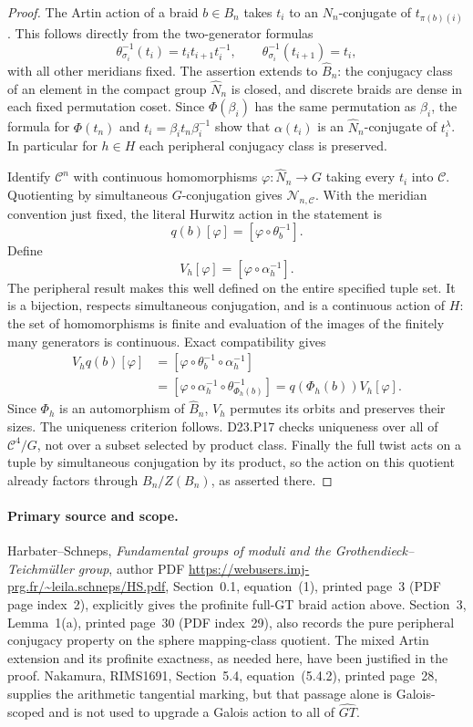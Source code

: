 \begin{proof}
The Artin action of a braid $b\in B_n$ takes $t_i$ to an
$N_n$-conjugate of $t_{\pi(b)(i)}$. This follows directly from
the two-generator formulas
\[
 \theta_{\sigma_i}^{-1}(t_i)=t_i t_{i+1}t_i^{-1},\qquad
 \theta_{\sigma_i}^{-1}(t_{i+1})=t_i,
\]
with all other meridians fixed. The assertion extends to
$\widehat B_n$: the conjugacy class of an element in the
compact group $\widehat N_n$ is closed, and discrete braids
are dense in each fixed permutation coset. Since
$\Phi(\beta_i)$ has the same permutation as $\beta_i$, the
formula for $\Phi(t_n)$ and $t_i=\beta_i t_n\beta_i^{-1}$
show that $\alpha(t_i)$ is an $\widehat N_n$-conjugate of
$t_i^\lambda$. In particular for $h\in H$ each peripheral
conjugacy class is preserved.

Identify $\mathcal C^n$ with continuous homomorphisms
$\varphi:\widehat N_n\to G$ taking every $t_i$ into
$\mathcal C$. Quotienting by simultaneous $G$-conjugation
gives $\mathcal N_{n,\mathcal C}$. With the meridian convention
just fixed, the literal Hurwitz action in the statement is
\[
 q(b)[\varphi]=[\varphi\circ\theta_b^{-1}].
\]
Define
\[
 V_h[\varphi]=[\varphi\circ\alpha_h^{-1}].
\]
The peripheral result makes this well defined on the entire
specified tuple set. It is a bijection, respects simultaneous
conjugation, and is a continuous action of $H$: the set of
homomorphisms is finite and evaluation of the images of the
finitely many generators is continuous. Exact compatibility
gives
\[
 \begin{split}
 V_h q(b)[\varphi]
   &=[\varphi\circ\theta_b^{-1}\circ\alpha_h^{-1}]\\
   &=[\varphi\circ\alpha_h^{-1}
                  \circ\theta_{\Phi_h(b)}^{-1}]
     =q(\Phi_h(b))V_h[\varphi].
 \end{split}
\]
Since $\Phi_h$ is an automorphism of $\widehat B_n$, $V_h$
permutes its orbits and preserves their sizes. The uniqueness
criterion follows. D23.P17 checks uniqueness over all of
$\mathcal C^4/G$, not over a subset selected by product class.
Finally the full twist acts on a tuple by simultaneous
conjugation by its product, so the action on this quotient
already factors through $B_n/Z(B_n)$, as asserted there.
\end{proof}

\paragraph{Primary source and scope.}
Harbater--Schneps, \emph{Fundamental groups of moduli and the
Grothendieck--Teichm\"uller group}, author PDF
\url{https://webusers.imj-prg.fr/~leila.schneps/HS.pdf},
Section~0.1, equation~(1), printed page~3 (PDF page index~2),
explicitly gives the profinite full-GT braid action above.
Section~3, Lemma~1(a), printed page~30 (PDF index~29), also
records the pure peripheral conjugacy property on the sphere
mapping-class quotient. The mixed Artin extension and its
profinite exactness, as needed here, have been justified in
the proof. Nakamura, RIMS1691, Section~5.4, equation~(5.4.2),
printed page~28, supplies the arithmetic tangential marking,
but that passage alone is Galois-scoped and is not used to
upgrade a Galois action to all of $\widehat{GT}$.

